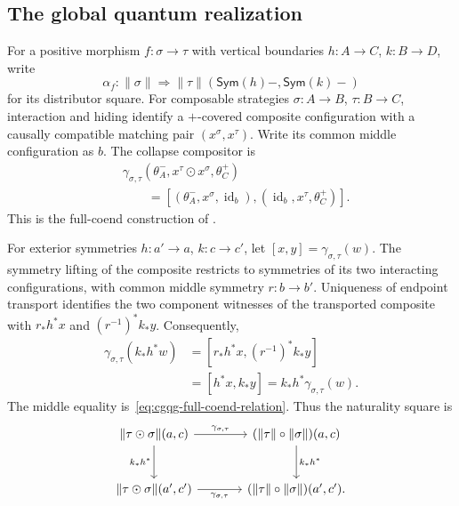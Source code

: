 \documentclass[oneside]{article}
\newcommand{\Sym}{\mathsf{Sym}}
\newcommand{\id}{\operatorname{id}}
\theoremstyle{plain}
\theoremstyle{definition}
\theoremstyle{remark}
\begin{document}
\subsection{The global quantum realization}
\label{subsec:cgqg-global-quantum-realization}

For a positive morphism \(f:\sigma\to\tau\) with vertical boundaries
\(h:A\to C\), \(k:B\to D\), write
\[
 \alpha_f:\lVert\sigma\rVert\Longrightarrow
 \lVert\tau\rVert(\Sym(h)-,\Sym(k)-)
\]
for its distributor square. For composable strategies
\(\sigma:A\to B\), \(\tau:B\to C\), interaction and hiding identify a
\(+\)-covered composite configuration with a causally compatible matching
pair \((x^\sigma,x^\tau)\). Write its common middle configuration as \(b\).
The collapse compositor is
\begin{equation}
 \begin{split}
 &\gamma_{\sigma,\tau}
   (\theta_A^-,x^\tau\odot x^\sigma,\theta_C^+)\\
 &\qquad=
 [(\theta_A^-,x^\sigma,\id_b),
   (\id_b,x^\tau,\theta_C^+)].
 \end{split}
 \label{eq:cgqg-full-compositor-witness-formula}
\end{equation}
This is the full-coend construction of
\cite[Proposition~5.13]{ClairambaultOlimpieriPaquet2025}.

For exterior symmetries \(h:a'\to a\), \(k:c\to c'\), let
\([x,y]=\gamma_{\sigma,\tau}(w)\). The symmetry lifting of the composite
restricts to symmetries of its two interacting configurations, with common
middle symmetry \(r:b\to b'\). Uniqueness of endpoint transport identifies
the two component witnesses of the transported composite with
\(r_*h^*x\) and \((r^{-1})^*k_*y\). Consequently,
\begin{equation}
 \begin{split}
 \gamma_{\sigma,\tau}(k_*h^*w)
   &=[r_*h^*x,(r^{-1})^*k_*y]\\
   &=[h^*x,k_*y]
    =k_*h^*\gamma_{\sigma,\tau}(w).
 \end{split}
 \label{eq:cgqg-full-compositor-naturality}
\end{equation}
The middle equality is~\eqref{eq:cgqg-full-coend-relation}. Thus the
naturality square is
\[
 \begin{tikzcd}[column sep=large,row sep=large]
 \lVert\tau\odot\sigma\rVert(a,c)
   \arrow[r,"\gamma_{\sigma,\tau}"]\arrow[d,"k_*h^*"']
   &(\lVert\tau\rVert\circ\lVert\sigma\rVert)(a,c)
       \arrow[d,"k_*h^*"]\\
 \lVert\tau\odot\sigma\rVert(a',c')
   \arrow[r,"\gamma_{\sigma,\tau}"']
   &(\lVert\tau\rVert\circ\lVert\sigma\rVert)(a',c').
 \end{tikzcd}
\]
\end{document}
